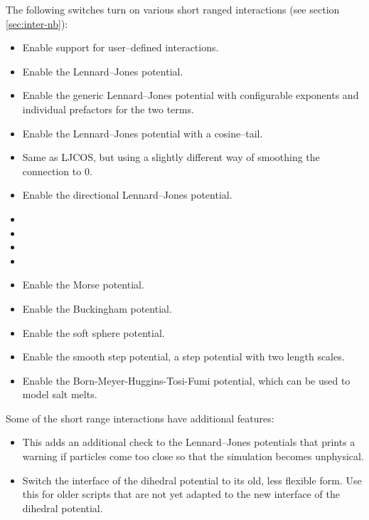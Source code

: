 The following switches turn on various short ranged interactions (see section
\vref{sec:inter-nb}):
\begin{itemize}
\item {} Enable support for user--defined
  interactions.
\item {} Enable the Lennard--Jones potential.
\item {} Enable the generic
  Lennard--Jones potential with configurable exponents and individual
  prefactors for the two terms.
\item {} Enable the Lennard--Jones potential with a cosine--tail.
\item {} Same as LJCOS, but using a slightly different way of
  smoothing the connection to 0.
\item {} Enable the directional Lennard--Jones potential.
\item {}
\item {}
\item {}
\item {}
\item {} Enable the Morse potential.
\item {} Enable the Buckingham potential.
\item {} Enable the soft sphere potential.
\item {} Enable the smooth step potential, a
  step potential with two length scales.
\item {} Enable the Born-Meyer-Huggins-Tosi-Fumi potential,
  which can be used to model salt melts.
\end{itemize}

Some of the short range interactions have additional features:
\begin{itemize}
\item {} This adds an additional check to
  the Lennard--Jones potentials that prints a warning if particles come
  too close so that the simulation becomes unphysical.
\item {} Switch the interface of the dihedral potential
  to its old, less flexible form. Use this for older scripts that are not yet
  adapted to the new interface of the dihedral potential.
\end{itemize}

